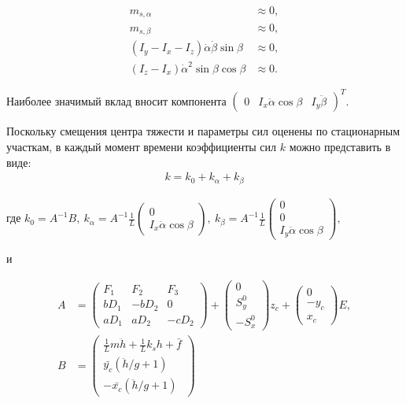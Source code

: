 \begin{equation}
\begin{aligned}
m_{s,\alpha} & \approx 0,\\
m_{s,\beta} & \approx 0,\\
\left(I_y - I_x - I_z\right)\dot{\alpha}\dot{\beta}\sin{\beta} & \approx 0,\\
\left(I_z - I_x\right)\dot{\alpha}^2 \sin{\beta}\cos{\beta} & \approx 0.
\end{aligned}
\end{equation}

Наиболее значимый вклад вносит компонента $\begin{pmatrix}0 & I_x\ddot{\alpha}\cos{\beta} & I_y \ddot{\beta} \end{pmatrix}^T$.

Поскольку смещения центра тяжести и параметры сил оценены по стационарным участкам, в каждый момент времени коэффициенты сил $k$ можно представить в виде:
\begin{equation}
\begin{aligned}
	k = k_0 + k_{\alpha} + k_{\beta}
\end{aligned}
\end{equation}

где
$k_0 = A^{-1}B,~k_{\alpha}=A^{-1}\frac{1}{L}\begin{pmatrix}0 \\ I_x\ddot{\alpha}\cos{\beta}\end{pmatrix},~k_{\beta}=A^{-1}\frac{1}{L}\begin{pmatrix}0 \\ 0 \\ I_y\ddot{\alpha}\cos{\beta}\end{pmatrix},~$

и

\begin{equation}
\begin{aligned}
	A & = \begin{pmatrix}F_1 & F_2 & F_3 \\ bD_1 & -bD_2 & 0 \\ aD_1 & aD_2 & -cD_2\end{pmatrix}+
	\begin{pmatrix}0 \\ S_y^0 \\ -S_x^0\end{pmatrix}z_c + \begin{pmatrix}0 \\ -y_c \\ x_c\end{pmatrix}E, \\
	B &= \begin{pmatrix}
	\frac{1}{L}m\ddot{h} + \frac{1}{L}k_sh + \bar{f}\\
	\bar{y_c}\left(\ddot{h}/g + 1\right) \\
	-\bar{x_c}\left(\ddot{h}/g + 1\right)
	\end{pmatrix}
\end{aligned}
\end{equation}

